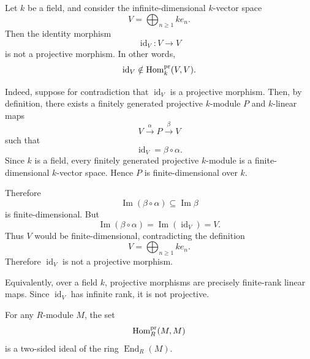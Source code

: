 \begin{example}
    Let $k$ be a field, and consider the infinite-dimensional $k$-vector space
    \[
        V=\bigoplus_{n\geq 1} k e_n .
    \]
    Then the identity morphism
    \[
        \operatorname{id}_V:V\longrightarrow V
    \]
    is not a projective morphism. In other words,
    \[
        \operatorname{id}_V\notin \mathrm{Hom}_k^{\operatorname{pr}}(V,V).
    \]

    Indeed, suppose for contradiction that $\operatorname{id}_V$ is a projective morphism.
    Then, by definition, there exists a finitely generated projective $k$-module $P$ and
    $k$-linear maps
    \[
        V\xrightarrow{\alpha} P \xrightarrow{\beta} V
    \]
    such that
    \[
        \operatorname{id}_V=\beta\circ\alpha.
    \]
    Since $k$ is a field, every finitely generated projective $k$-module is a finite-dimensional
    $k$-vector space. Hence $P$ is finite-dimensional over $k$.

    Therefore
    \[
        \operatorname{Im}(\beta\circ\alpha)\subseteq \operatorname{Im}\beta
    \]
    is finite-dimensional. But
    \[
        \operatorname{Im}(\beta\circ\alpha)
        =
        \operatorname{Im}(\operatorname{id}_V)
        =
        V.
    \]
    Thus $V$ would be finite-dimensional, contradicting the definition
    \[
        V=\bigoplus_{n\geq 1} k e_n.
    \]
    Therefore $\operatorname{id}_V$ is not a projective morphism.

    Equivalently, over a field $k$, projective morphisms are precisely finite-rank linear
    maps. Since $\operatorname{id}_V$ has infinite rank, it is not projective.
\end{example}

\begin{lemma}
    For any $R$-module $M$, the set
    \[
        \mathrm{Hom}_R^{\operatorname{pr}}(M,M)
    \]
    is a two-sided ideal of the ring $\operatorname{End}_R(M)$.
\end{lemma}

